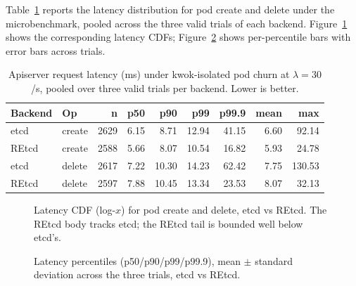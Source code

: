 Table~\ref{tab:eval-steady} reports the latency distribution for pod create and delete under the microbenchmark, pooled across the three valid trials of each backend. Figure~\ref{fig:eval-cdf} shows the corresponding latency CDFs; Figure~\ref{fig:eval-bars} shows per-percentile bars with error bars across trials.

\begin{table}[h]
    \centering
    \caption{Apiserver request latency (ms) under kwok-isolated pod churn at $\lambda = 30$/s, pooled over three valid trials per backend. Lower is better.}
    \label{tab:eval-steady}
    \begin{tabular}{@{}llrrrrrrr@{}}
        \toprule
        \textbf{Backend} & \textbf{Op} & \textbf{n} & \textbf{p50} & \textbf{p90} & \textbf{p99} & \textbf{p99.9} & \textbf{mean} & \textbf{max} \\
        \midrule
        etcd  & create & 2629 & 6.15 &  8.71 & 12.94 & 41.15 & 6.60 &  92.14 \\
        REtcd & create & 2588 & 5.66 &  8.07 & 10.54 & 16.82 & 5.93 &  24.78 \\
        \addlinespace
        etcd  & delete & 2617 & 7.22 & 10.30 & 14.23 & 62.42 & 7.75 & 130.53 \\
        REtcd & delete & 2597 & 7.88 & 10.45 & 13.34 & 23.53 & 8.07 &  32.13 \\
        \bottomrule
    \end{tabular}
\end{table}

\begin{figure}[h]
    \centering
    \caption{Latency CDF (log-$x$) for pod create and delete, etcd vs REtcd. The REtcd body tracks etcd; the REtcd tail is bounded well below etcd's.}
    \label{fig:eval-cdf}
\end{figure}

\begin{figure}[h]
    \centering
    \caption{Latency percentiles (p50/p90/p99/p99.9), mean $\pm$ standard deviation across the three trials, etcd vs REtcd.}
    \label{fig:eval-bars}
\end{figure}

